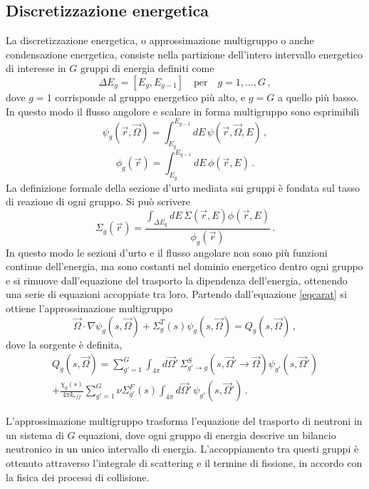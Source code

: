 \subsection{Discretizzazione energetica}
La discretizzazione energetica, o approssimazione multigruppo o anche 
condensazione energetica, consiste nella partizione dell'intero intervallo 
energetico di interesse in $G$ gruppi di energia definiti come 
\begin{equation}
\Delta E_g = [E_g,E_{g-1}] \quad \text{per} \quad g=1,\dots ,G \,,
\end{equation}
dove $g=1$ corrisponde al gruppo energetico più alto, e $g=G$ a quello più 
basso.
In questo modo il flusso angolore e scalare in forma multigruppo sono esprimibili
\begin{equation}
\psi_g(\vec{r},\vec{\Omega})=\int_{E_g}^{E_{g-1}} 
dE\,\psi(\vec{r},\vec{\Omega},E) \,,
\end{equation}
\begin{equation}
\phi_g(\vec{r})=\int_{E_g}^{E_{g-1}} dE\,\phi(\vec{r},E) \,.
\end{equation}
La definizione formale della sezione d'urto mediata sui gruppi è fondata sul 
 tasso di reazione di ogni gruppo. Si pu\`o scrivere
\begin{equation}
\Sigma_g(\vec{r})=\frac{\int_{\Delta E_g} dE \, 
\Sigma(\vec{r},E)\phi(\vec{r},E)}{\phi_g(\vec{r})} \,.
\end{equation}
In questo modo le sezioni d'urto e il flusso angolare non sono più funzioni 
continue dell'energia, ma sono costanti nel dominio energetico dentro ogni gruppo 
e si rimuove dall'equazione del trasporto la dipendenza dell'energia, ottenendo 
una serie di equazioni accoppiate tra loro.
Partendo dall'equazione \eqref{eqcarat} si ottiene l'approssimazione multigruppo
\begin{equation}
\label{eq_multigrup}
\vec{\Omega}\cdot \nabla	
\psi_g(s,\vec{\Omega})+\Sigma_g^T(s)\psi_g(s,\vec{\Omega})=Q_g(s,\vec{\Omega}) 
\,,
\end{equation}
dove la sorgente è definita,
\begin{multline}
Q_g(s,\vec{\Omega})=\sum_{g'=1}^G \int_{4\pi} d\vec{\Omega}'\, \Sigma_{g' 
\rightarrow g}^S (s,\vec{\Omega}'\rightarrow 
\vec{\Omega})\psi_{g'}(s,\vec{\Omega}')\\
+\frac{\chi_g(s)}{4\pi k_{eff}}\sum_{g'=1}^G\nu \Sigma_{g'}^F (s) 
\int_{4\pi}d\vec{\Omega}'\, \psi_{g'}(s,\vec{\Omega}') \,.
\end{multline}

L'approssimazione multigruppo trasforma l'equazione del trasporto di neutroni in 
un sistema di $G$ equazioni, dove ogni gruppo di energia descrive un bilancio 
neutronico in un unico intervallo di energia.
L'accoppiamento tra questi gruppi è ottenuto attraverso l'integrale di 
scattering e il termine di fissione, in accordo con la fisica dei processi di 
collisione.

